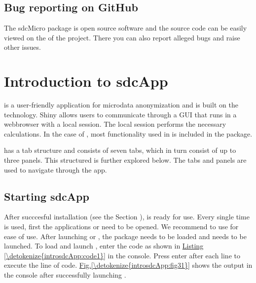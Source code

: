 \documentclass[letterpaper,10pt,english]{sphinxmanual}
\begin{document}
\section{Bug reporting on GitHub}
\label{\detokenize{installation:bug-reporting-on-github}}
The sdcMicro package is open source software and the source code can be easily viewed on
the  of the  project. There you can
also report alleged bugs and raise other issues.


\chapter{Introduction to sdcApp}
\label{\detokenize{introsdcApp::doc}}\label{\detokenize{introsdcApp:introduction-to-sdcapp}}
 is a user-friendly application for microdata anonymization
and is built on the 
technology. Shiny allows users to
communicate through a GUI that runs in a webbrowser with a local  session. The local
 session performs the necessary calculations. In the case of , most functionality
used in  is included in the 
package.

 has a tab structure and consists of seven tabs, which in turn consist of
up to three panels. This structured is further explored below.
The tabs and panels are used to navigate through the app.


\section{Starting sdcApp}
\label{\detokenize{introsdcApp:starting-sdcapp}}
After succcesful installation (see the Section ),
 is ready for use. Every single time  is used,
first the applications  or  need to be opened. We recommend to use 
for ease of use. After launching  or ,
the  package needs to be loaded and  needs to be launched.
To load  and launch , enter the code as shown in \hyperref[\detokenize{introsdcApp:code1}]{Listing \ref{\detokenize{introsdcApp:code1}}} in the  console.
Press enter after each line to execute the line of code. \hyperref[\detokenize{introsdcApp:fig31}]{Fig.\@ \ref{\detokenize{introsdcApp:fig31}}} shows the
output in the  console after successfully launching .
\end{document}
